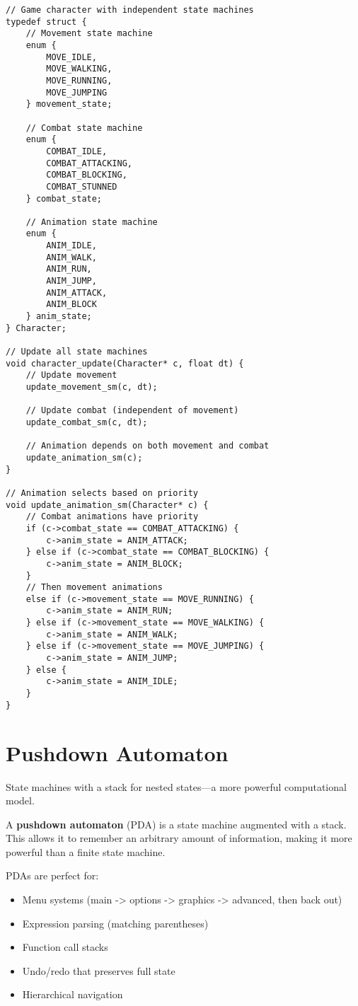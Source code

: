 \begin{lstlisting}
// Game character with independent state machines
typedef struct {
    // Movement state machine
    enum {
        MOVE_IDLE,
        MOVE_WALKING,
        MOVE_RUNNING,
        MOVE_JUMPING
    } movement_state;

    // Combat state machine
    enum {
        COMBAT_IDLE,
        COMBAT_ATTACKING,
        COMBAT_BLOCKING,
        COMBAT_STUNNED
    } combat_state;

    // Animation state machine
    enum {
        ANIM_IDLE,
        ANIM_WALK,
        ANIM_RUN,
        ANIM_JUMP,
        ANIM_ATTACK,
        ANIM_BLOCK
    } anim_state;
} Character;

// Update all state machines
void character_update(Character* c, float dt) {
    // Update movement
    update_movement_sm(c, dt);

    // Update combat (independent of movement)
    update_combat_sm(c, dt);

    // Animation depends on both movement and combat
    update_animation_sm(c);
}

// Animation selects based on priority
void update_animation_sm(Character* c) {
    // Combat animations have priority
    if (c->combat_state == COMBAT_ATTACKING) {
        c->anim_state = ANIM_ATTACK;
    } else if (c->combat_state == COMBAT_BLOCKING) {
        c->anim_state = ANIM_BLOCK;
    }
    // Then movement animations
    else if (c->movement_state == MOVE_RUNNING) {
        c->anim_state = ANIM_RUN;
    } else if (c->movement_state == MOVE_WALKING) {
        c->anim_state = ANIM_WALK;
    } else if (c->movement_state == MOVE_JUMPING) {
        c->anim_state = ANIM_JUMP;
    } else {
        c->anim_state = ANIM_IDLE;
    }
}
\end{lstlisting}

\section{Pushdown Automaton}

State machines with a stack for nested states---a more powerful computational model.

A \textbf{pushdown automaton} (PDA) is a state machine augmented with a stack. This allows it to remember an arbitrary amount of information, making it more powerful than a finite state machine.

PDAs are perfect for:
\begin{itemize}
    \item Menu systems (main -> options -> graphics -> advanced, then back out)
    \item Expression parsing (matching parentheses)
    \item Function call stacks
    \item Undo/redo that preserves full state
    \item Hierarchical navigation
\end{itemize}

